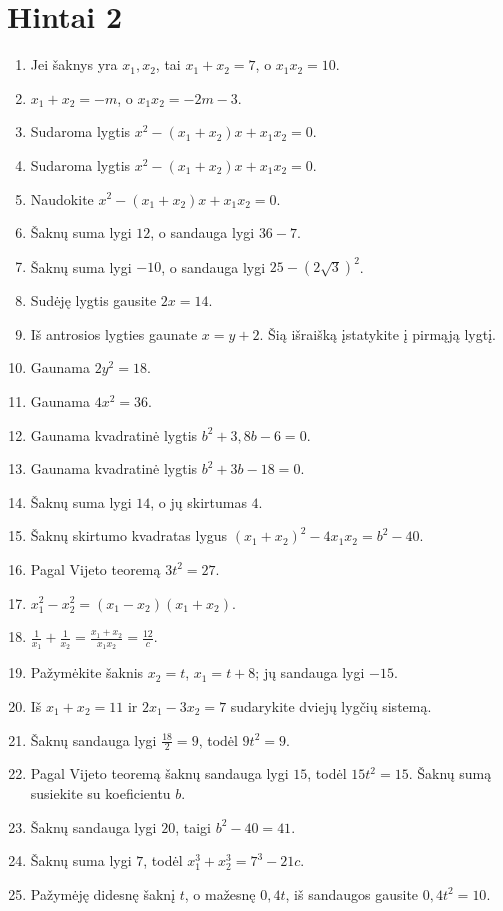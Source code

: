 \documentclass[11pt,a4paper]{scrartcl}
\begin{document}
\newpage
\section{Hintai 2}

\begin{enumerate}[label=\textbf{\arabic*.}, leftmargin=*]
    \item Jei šaknys yra $x_1,x_2$, tai $x_1+x_2=7$, o $x_1x_2=10$.
    \item $x_1+x_2=-m$, o $x_1x_2=-2m-3$.
    \item Sudaroma lygtis $x^2-(x_1+x_2)x+x_1x_2=0$.
    \item Sudaroma lygtis $x^2-(x_1+x_2)x+x_1x_2=0$.
    \item Naudokite $x^2-(x_1+x_2)x+x_1x_2=0$.
    \item Šaknų suma lygi $12$, o sandauga lygi $36-7$.
    \item Šaknų suma lygi $-10$, o sandauga lygi $25-(2\sqrt3)^2$.
    \item Sudėję lygtis gausite $2x=14$.
    \item Iš antrosios lygties gaunate $x=y+2$. Šią išraišką įstatykite į pirmąją lygtį.
    \item Gaunama $2y^2=18$.
    \item Gaunama $4x^2=36$.
    \item Gaunama kvadratinė lygtis $b^2+3{,}8b-6=0$.
    \item Gaunama kvadratinė lygtis $b^2+3b-18=0$.
    \item Šaknų suma lygi $14$, o jų skirtumas $4$.
    \item Šaknų skirtumo kvadratas lygus $(x_1+x_2)^2-4x_1x_2=b^2-40$.
    \item Pagal Vijeto teoremą $3t^2=27$.
    \item $x_1^2-x_2^2=(x_1-x_2)(x_1+x_2)$.
    \item $\frac1{x_1}+\frac1{x_2}=\frac{x_1+x_2}{x_1x_2}=\frac{12}{c}$.
    \item Pažymėkite šaknis $x_2=t$, $x_1=t+8$; jų sandauga lygi $-15$.
    \item Iš $x_1+x_2=11$ ir $2x_1-3x_2=7$ sudarykite dviejų lygčių sistemą.
    \item Šaknų sandauga lygi $\frac{18}{2}=9$, todėl $9t^2=9$.
    \item Pagal Vijeto teoremą šaknų sandauga lygi $15$, todėl $15t^2=15$. Šaknų sumą susiekite su koeficientu $b$.
    \item Šaknų sandauga lygi $20$, taigi $b^2-40=41$.
    \item Šaknų suma lygi $7$, todėl $x_1^3+x_2^3=7^3-21c$.
    \item Pažymėję didesnę šaknį $t$, o mažesnę $0{,}4t$, iš sandaugos gausite $0{,}4t^2=10$.
\end{enumerate}
\end{document}
